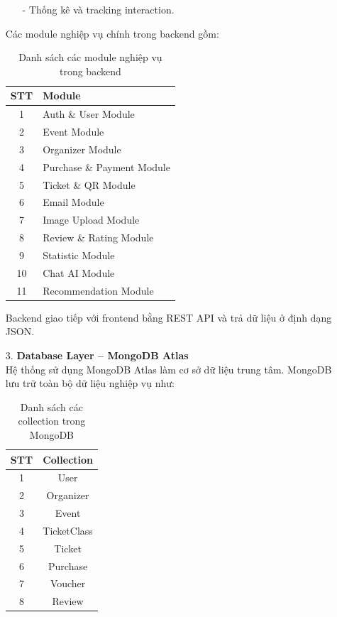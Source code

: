 \begin{itemize}
\begin{itemize}
        \item[-] Thống kê và tracking interaction.
    \end{itemize}
    Các module nghiệp vụ chính trong backend gồm:
    \begin{table}[H]
    \centering
    \caption{Danh sách các module nghiệp vụ trong backend}
    \begin{tabular}{|c|l|}
    \hline
    \textbf{STT} & \textbf{Module} \\ \hline
    1 & Auth \& User Module \\ \hline
    2 & Event Module \\ \hline
    3 & Organizer Module \\ \hline
    4 & Purchase \& Payment Module \\ \hline
    5 & Ticket \& QR Module \\ \hline
    6 & Email Module \\ \hline
    7 & Image Upload Module \\ \hline
    8 & Review \& Rating Module \\ \hline
    9 & Statistic Module \\ \hline
    10 & Chat AI Module \\ \hline
    11 & Recommendation Module \\ \hline
    \end{tabular}
    \end{table}
    Backend giao tiếp với frontend bằng REST API và trả dữ liệu ở định dạng JSON.
    \item[3.] \textbf{ Database Layer – MongoDB Atlas}\\
    Hệ thống sử dụng MongoDB Atlas làm cơ sở dữ liệu trung tâm.
    MongoDB lưu trữ toàn bộ dữ liệu nghiệp vụ như:
    \begin{table}[H]
    \centering
    \caption{Danh sách các collection trong MongoDB}
    \begin{tabular}{|c|c|}
    \hline
    \textbf{STT} & \textbf{Collection} \\ \hline
    1 & User \\ \hline
    2 & Organizer \\ \hline
    3 & Event \\ \hline
    4 & TicketClass \\ \hline
    5 & Ticket \\ \hline
    6 & Purchase \\ \hline
    7 & Voucher \\ \hline
    8 & Review \\ \hline

\end{tabular}
\end{table}
\end{itemize}
